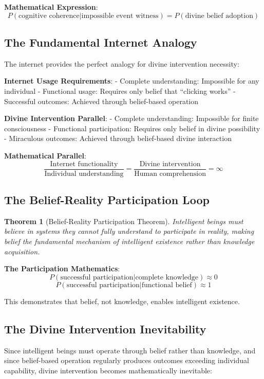 \documentclass[12pt,a4paper]{article}
\newtheorem{theorem}{Theorem}[section]
\begin{document}
\textbf{Mathematical Expression}:
$$P(\text{cognitive coherence}|\text{impossible event witness}) = P(\text{divine belief adoption})$$

\subsection{The Fundamental Internet Analogy}

The internet provides the perfect analogy for divine intervention necessity:

\textbf{Internet Usage Requirements}:
- Complete understanding: Impossible for any individual
- Functional usage: Requires only belief that ``clicking works''
- Successful outcomes: Achieved through belief-based operation

\textbf{Divine Intervention Parallel}:
- Complete understanding: Impossible for finite consciousness
- Functional participation: Requires only belief in divine possibility
- Miraculous outcomes: Achieved through belief-based divine interaction

\textbf{Mathematical Parallel}:
$$\frac{\text{Internet functionality}}{\text{Individual understanding}} = \frac{\text{Divine intervention}}{\text{Human comprehension}} = \infty$$

\subsection{The Belief-Reality Participation Loop}

\begin{theorem}[Belief-Reality Participation Theorem]
Intelligent beings must believe in systems they cannot fully understand to participate in reality, making belief the fundamental mechanism of intelligent existence rather than knowledge acquisition.
\end{theorem}

\textbf{The Participation Mathematics}:
$$P(\text{successful participation}|\text{complete knowledge}) \approx 0$$
$$P(\text{successful participation}|\text{functional belief}) \approx 1$$

This demonstrates that belief, not knowledge, enables intelligent existence.

\subsection{The Divine Intervention Inevitability}

Since intelligent beings must operate through belief rather than knowledge, and since belief-based operation regularly produces outcomes exceeding individual capability, divine intervention becomes mathematically inevitable:
\end{document}
